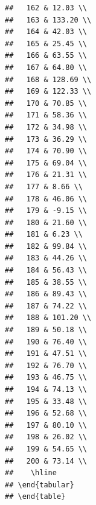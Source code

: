 \documentclass{article}\usepackage[]{graphicx}\usepackage[]{color}
\makeatletter
\newenvironment{kframe}{%
 \def\at@end@of@kframe{}%
 \ifinner\ifhmode%
  \def\at@end@of@kframe{\end{minipage}}%
  \begin{minipage}{\columnwidth}%
 \fi\fi%
 \def\FrameCommand##1{\hskip\@totalleftmargin \hskip-\fboxsep
 \colorbox{shadecolor}{##1}\hskip-\fboxsep
     \hskip-\linewidth \hskip-\@totalleftmargin \hskip\columnwidth}%
 \MakeFramed {\advance\hsize-\width
   \@totalleftmargin\z@ \linewidth\hsize
   \@setminipage}}%
 {\par\unskip\endMakeFramed%
 \at@end@of@kframe}
\newenvironment{knitrout}{}{} %
\makeatother
\begin{document}
\begin{knitrout}
\begin{kframe}
\begin{verbatim}
##   162 & 12.03 \\ 
##   163 & 133.20 \\ 
##   164 & 42.03 \\ 
##   165 & 25.45 \\ 
##   166 & 63.55 \\ 
##   167 & 64.80 \\ 
##   168 & 128.69 \\ 
##   169 & 122.33 \\ 
##   170 & 70.85 \\ 
##   171 & 58.36 \\ 
##   172 & 34.98 \\ 
##   173 & 36.29 \\ 
##   174 & 70.90 \\ 
##   175 & 69.04 \\ 
##   176 & 21.31 \\ 
##   177 & 8.66 \\ 
##   178 & 46.06 \\ 
##   179 & -9.15 \\ 
##   180 & 21.60 \\ 
##   181 & 6.23 \\ 
##   182 & 99.84 \\ 
##   183 & 44.26 \\ 
##   184 & 56.43 \\ 
##   185 & 38.55 \\ 
##   186 & 89.43 \\ 
##   187 & 74.22 \\ 
##   188 & 101.20 \\ 
##   189 & 50.18 \\ 
##   190 & 76.40 \\ 
##   191 & 47.51 \\ 
##   192 & 76.70 \\ 
##   193 & 46.75 \\ 
##   194 & 74.13 \\ 
##   195 & 33.48 \\ 
##   196 & 52.68 \\ 
##   197 & 80.10 \\ 
##   198 & 26.02 \\ 
##   199 & 54.65 \\ 
##   200 & 73.14 \\ 
##    \hline
## \end{tabular}
## \end{table}
\end{verbatim}
\end{kframe}
\end{knitrout}
\end{document}
